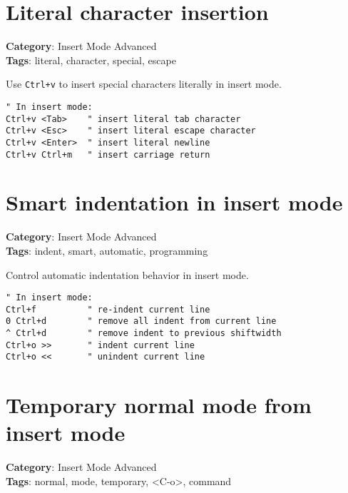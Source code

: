 {{{{{\section{Literal character insertion}

\textbf{Category}: Insert Mode Advanced\\ \textbf{Tags}: literal, character, special, escape
\vspace{0.5cm}

Use {\footnotesize \Verb§Ctrl+v§} to insert special characters literally in insert mode.

\begin{Exa*}{}
\begin{Verbatim}[fontsize=\footnotesize, breaklines, breakanywhere]
" In insert mode:
Ctrl+v <Tab>    " insert literal tab character
Ctrl+v <Esc>    " insert literal escape character
Ctrl+v <Enter>  " insert literal newline
Ctrl+v Ctrl+m   " insert carriage return
\end{Verbatim}
\end{Exa*}

\section{Smart indentation in insert mode}

\textbf{Category}: Insert Mode Advanced\\ \textbf{Tags}: indent, smart, automatic, programming
\vspace{0.5cm}

Control automatic indentation behavior in insert mode.

\begin{Exa*}{}
\begin{Verbatim}[fontsize=\footnotesize, breaklines, breakanywhere]
" In insert mode:
Ctrl+f          " re-indent current line
0 Ctrl+d        " remove all indent from current line
^ Ctrl+d        " remove indent to previous shiftwidth
Ctrl+o >>       " indent current line
Ctrl+o <<       " unindent current line
\end{Verbatim}
\end{Exa*}

\section{Temporary normal mode from insert mode}

\textbf{Category}: Insert Mode Advanced\\ \textbf{Tags}: normal, mode, temporary, <C-o>, command
\vspace{0.5cm}

}}}}}
